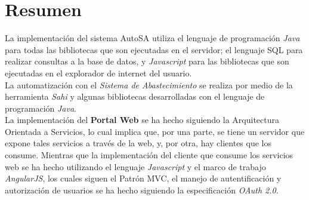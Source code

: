%



%

\section{Resumen}
La implementación del sistema AutoSA utiliza el lenguaje de programación \textit{Java} para todas las bibliotecas que son ejecutadas en el servidor; el lenguaje SQL para realizar consultas a la base de datos, y \textit{Javascript} para las bibliotecas que son ejecutadas en el explorador de internet del usuario.\\
La automatización con el \textit{Sistema de Abastecimiento} se realiza por medio de la herramienta \textit{Sahi} y algunas bibliotecas desarrolladas con el lenguaje de programación \textit{Java}.\\
La implementación del \textbf{Portal Web} se ha hecho siguiendo la Arquitectura Orientada a Servicios, lo cual implica que, por una parte, se tiene un servidor que expone tales servicios a través de la web, y, por otra, hay clientes que los consume. Mientras que la implementación del cliente que consume los servicios web se ha hecho utilizando el lenguaje \textit{Javascript} y el marco de trabajo \textit{AngularJS}, los cuales siguen el Patrón MVC, el manejo de autentificación y autorización de usuarios se ha hecho siguiendo la especificación \textit{OAuth 2.0}.

